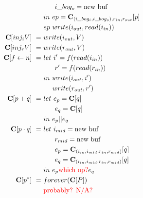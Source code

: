 \documentclass[12pt, letterpaper]{article}
\begin{document}
{\begin{align*}
             &\quad\ \ i\_bog_o = \text{new buf}\\
             &in\ ep = \mathbf{C}_{(i\_bog_i, i\_bog_o), r_{in}, r_{out}}[p]\\
             &ep\ write(i_{out}, read(i_{in}))
             \\
         \mathbf{C}[inj_iV]\ 
             =\ &
             write(i_{out}, V)
             \\
         \mathbf{C}[inj_rV]\ 
             =\ &
             write(r_{out}, V)
             \\
         \mathbf{C}[f \leftarrow n]\ 
             =\ &
             let\ i' = f(read(i_{in}))\\
             &\quad\ \ r' = f(read(r_{in}))\\
             &in\ write(i_{out}, i')\\
             &\quad \ write(r_{out}, r')
             \\
         \mathbf{C}[p + q]\ 
             =\ &
             let\ e_p = \mathbf{C}[q]\\
             &\quad\ \ e_q = \mathbf{C}[q]\\
             &in\ e_p||e_q
             \\
         \mathbf{C}[p \cdot q]\ 
             =\ &
             let\ i_{mid} = \text{new buf}\\
             &\quad\ \ r_{mid} = \text{new buf}\\
             &\quad\ \ e_p = \mathbf{C}_{(i_{in}, i_{mid}, r_{in}, r_{mid})}[q]\\
             &\quad\ \ e_q = \mathbf{C}_{(i_{in}, i_{mid}, r_{in}, r_{mid})}[q]\\
             &in\ e_p\text{\textcolor{red}{which op?}}e_q
             \\
         \mathbf{C}[p ^{*}]\ 
             =\ &
             forever(\mathbf{C}[P])\\
             &\text{\textcolor{red}{probably?  N/A?}}
             \\
     \end{align*}
 }
\end{document}
